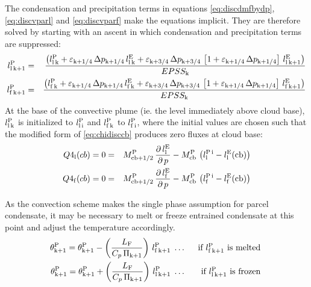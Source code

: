 \documentclass{UMDP_article}
\newcommand{\lsubsup}[2]{\ensuremath{l_{\rm{#1}}^{\rm{#2}}}}
\newcommand{\lc}{\left[}
\newcommand{\rc}{\right]}
\newcommand{\lp}{\left(}
\newcommand{\rp}{\right)}
\newcommand{\pardbyd}[2]{\ensuremath{\frac{\partial \, #1}{\partial \, #2}}}
\begin{document}
The condensation and precipitation terms in equations \ref{eq:discdmfbydp},
\ref{eq:discvparl} and \ref{eq:discvparf} make the equations implicit.
They are therefore solved by starting with an ascent in which condensation and
precipitation terms are suppressed:
%
\begin{eqnarray}
\lsubsup{l \, k + 1}{P} & = & \frac{\lp { 
\lsubsup{l \, k}{P} +  
\varepsilon_{\rm{k} + 1/4} \, \Delta p_{\rm{k} + 1/4} \, \lsubsup{l \, k}{E} +
\varepsilon_{\rm{k} + 3/4} \, \Delta p_{\rm{k} + 3/4} \, 
\lc {1 + \varepsilon_{\rm{k} + 1 / 4} \, \Delta p_{\rm{k} + 1 / 4}} \rc \,
\lsubsup{l \, k + 1}{E}
} \rp}{EPSS_{\rm{k}}}  \label{eq:discvparldry} \\
\lsubsup{f \, k + 1}{P} & = & \frac{\lp { 
\lsubsup{f \, k}{P} + 
\varepsilon_{\rm{k} + 1/4} \, \Delta p_{\rm{k} + 1/4} \, \lsubsup{f \, k}{E} +
\varepsilon_{\rm{k} + 3/4} \, \Delta p_{\rm{k} + 3/4} \, 
\lc {1 + \varepsilon_{\rm{k} + 1 / 4} \, \Delta p_{\rm{k} + 1 / 4}} \rc \,
\lsubsup{f \, k + 1}{E}
} \rp}{EPSS_{\rm{k}}}  \label{eq:discvparfdry}
\end{eqnarray}
%
At the base of the convective plume (ie. the level immediately above cloud
base), \lsubsup{l \, k}{P} is initialized to \lsubsup{l \, i}{P} and 
\lsubsup{f \, k}{P} to \lsubsup{f \, i}{P}, where the initial values are chosen
such that the modified form of \ref{eq:chidisccb} produces zero fluxes at
cloud base:
%
\begin{eqnarray}
Q4_{\rm{l}}(cb) = 0 & = & M_{\rm{cb+1/2}}^{\rm{P}} \, 
\pardbyd{\lsubsup{l}{E}}{p}  - M_{\rm{cb}}^{\rm{P}}\, 
\lp { \lsubsup{l}{P \, i} - \lsubsup{l}{E}(\rm{cb}) } \rp  \label{eq:q4lcbi} \\ 
Q4_{\rm{f}}(cb) = 0 & = & M_{\rm{cb+1/2}}^{\rm{P}} \, 
\pardbyd{\lsubsup{f}{E}}{p}  - M_{\rm{cb}}^{\rm{P}}\, 
\lp { \lsubsup{f}{P \, i} - \lsubsup{f}{E}(\rm{cb}) } \rp  \label{eq:q4fcbi} 
\end{eqnarray}


As the convection scheme makes the single phase assumption for parcel
condensate, it may be necessary to melt or freeze entrained condensate at this
point and adjust the temperature accordingly. 
%
\begin{eqnarray}
\theta_{\rm{k + 1}}^{\rm{P}} = \theta_{\rm{k + 1}}^{\rm{P}} - 
\lp \frac{L_{\rm{F}}}{C_{p} \, \Pi_{\rm{k + 1}}} \rp \, \lsubsup{f \, k + 1}{P} 
& \; \ldots \; & \mbox{ if \lsubsup{f \, k + 1}{P} is melted }  
\label{eqn:meltlf} \\
\theta_{\rm{k + 1}}^{\rm{P}} = \theta_{\rm{k + 1}}^{\rm{P}} + 
\lp \frac{L_{\rm{F}}}{C_{p} \, \Pi_{\rm{k + 1}}} \rp \, \lsubsup{l \, k + 1}{P} 
& \; \ldots \; & \mbox{ if \lsubsup{l \, k + 1}{P} is frozen }  
\label{eqn:freezell} 
\end{eqnarray}
\end{document}

